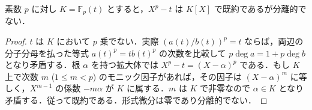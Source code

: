 \begin{example}[非分離多項式]
素数 $p$ に対し $K=\mathbb F_p(t)$ とすると，$X^p-t$ は $K[X]$ で既約であるが分離的でない．
\end{example}
\begin{proof}
$t$ は $K$ において $p$ 乗でない．実際 $(a(t)/b(t))^p=t$ ならば，両辺の分子分母を払った等式 $a(t)^p=t b(t)^p$ の次数を比較して $p\deg a=1+p\deg b$ となり矛盾する．根 $\alpha$ を持つ拡大体では $X^p-t=(X-\alpha)^p$ である．もし $K$ 上で次数 $m$ ($1\leq m<p$) のモニック因子があれば，その因子は $(X-\alpha)^m$ に等しく，$X^{m-1}$ の係数 $-m\alpha$ が $K$ に属する．$m$ は $K$ で非零なので $\alpha\in K$ となり矛盾する．従って既約である．形式微分は零であり分離的でない．
\end{proof}
